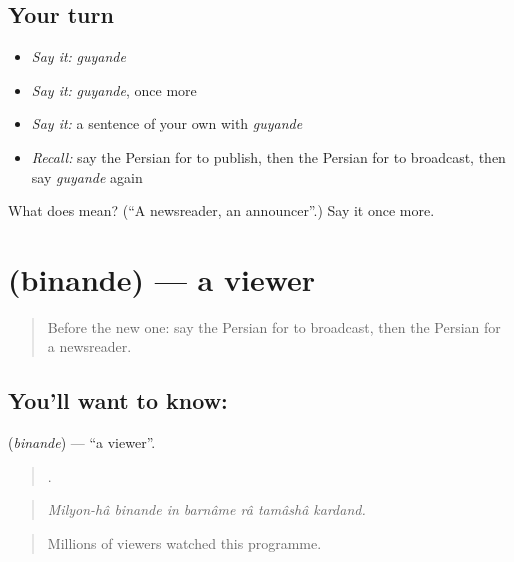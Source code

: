 \subsection*{Your turn}
\begin{itemize}
\raggedright
  \item \emph{Say it:} \emph{guyande}
  \item \emph{Say it:} \emph{guyande}, once more
  \item \emph{Say it:} a sentence of your own with \emph{guyande}
  \item \emph{Recall:} say the Persian for to publish, then the Persian for to broadcast, then say \emph{guyande} again
\end{itemize}

\begin{tcolorbox}[breakable,colback=teal!4,colframe=teal!35!black,title={Before you move on}]
What does  mean? (\textquotedblleft{}A newsreader, an announcer\textquotedblright{}.) Say it once more.
\end{tcolorbox}
\section[\texorpdfstring{\fa{بیننده} (binande)}{بیننده (binande)}]{ (binande) — a viewer}

\label{lesson:FA-C312-binande}



\begin{quote}
Before the new one: say the Persian for to broadcast, then the Persian for a newsreader.
\end{quote}

\subsection*{You'll want to know: }
\textbf{} (\emph{binande}) — \textquotedblleft{}a viewer\textquotedblright{}.

\begin{quote}
       .
\end{quote}

\begin{quote}
\emph{Milyon-hâ binande in barnâme râ tamâshâ kardand.}
\end{quote}

\begin{quote}
Millions of viewers watched this programme.
\end{quote}

